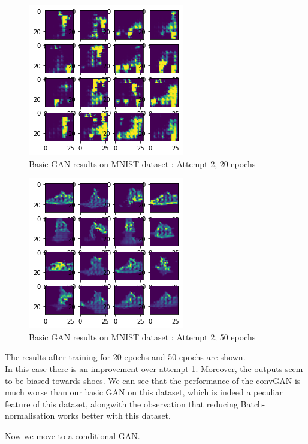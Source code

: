 \documentclass[conference]{IEEEtran}
\begin{document}
\begin{itemize}
   \begin{figure}[h]
    \centering
    \includegraphics[scale = 0.6]{convGAN_FashionMNIST_20epoc_LESSBNORM (less bad).png}
      \caption{Basic GAN results on MNIST dataset : Attempt 2, 20 epochs}
    \end{figure}
     \begin{figure}[h]
    \centering
    \includegraphics[scale = 0.6]{convGAN_FashionMNIST_50epoc_LESSBNORM (nice).png}
      \caption{Basic GAN results on MNIST dataset : Attempt 2, 50 epochs}
    \end{figure}
    
    The results after training for 20 epochs and 50 epochs are shown.\\
    In this case there is an improvement over attempt 1. Moreover, the outputs seem to be biased towards shoes. We can see that the performance of the convGAN is much worse than our basic GAN on this dataset, which is indeed a peculiar feature of this dataset, alongwith the observation that reducing Batch-normalisation works better with this dataset.
\end{itemize}
Now we move to a conditional GAN.
\end{document}
